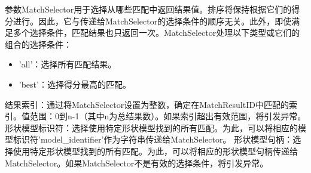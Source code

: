 \documentclass{article}
\begin{document}
参数MatchSelector用于选择从哪些匹配中返回结果值。排序将保持根据它们的得分进行。因此，它与传递给MatchSelector的选择条件的顺序无关。此外，即使满足多个选择条件，匹配结果也只返回一次。MatchSelector处理以下类型或它们的组合的选择条件：

\begin{itemize}
	\item 'all'：选择所有匹配结果。
	\item 'best'：选择得分最高的匹配。
\end{itemize}

结果索引：通过将MatchSelector设置为整数，确定在MatchResultID中匹配的索引。值范围：0到n-1（其中n为总结果数）。如果索引超出有效范围，将引发异常。
形状模型标识符：选择使用特定形状模型找到的所有匹配。为此，可以将相应的模型标识符'model\_identifier'作为字符串传递给MatchSelector。
形状模型句柄：选择使用特定形状模型找到的所有匹配。为此，可以将相应的形状模型句柄传递给MatchSelector。如果MatchSelector不是有效的选择条件，将引发异常。
\end{document}
